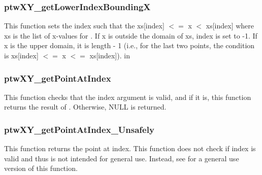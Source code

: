 \subsubsection{ptwXY\_getLowerIndexBoundingX}
This function sets the index such that the xs[index] $<=$ x $<$ xs[index] where xs is the list of x-values for . 
If x is outside the domain of xs, index is set to -1. If x is the upper domain, it is length - 1 (i.e., for the last two points, the condition
is xs[index] $<=$ x $<=$ xs[index]).
     in \noindent

\subsubsection{ptwXY\_getPointAtIndex}
This function checks that the index argument is valid, and if it is, this function returns the result 
of . Otherwise, NULL is returned.

\subsubsection{ptwXY\_getPointAtIndex\_Unsafely}
This function returns the point at index. This function does not check if index is valid and 
thus is not intended for general use. Instead, see  for a general use version of this function.


